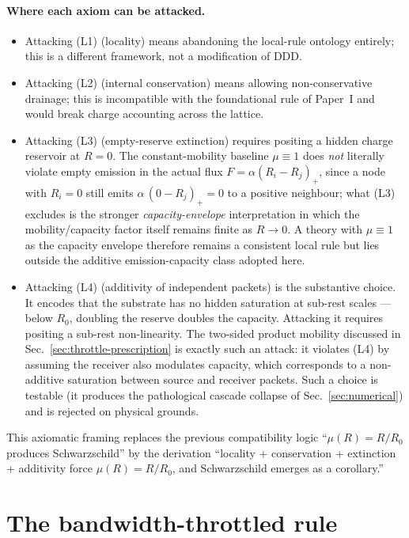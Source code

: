 \documentclass[11pt,a4paper]{article}
\begin{document}
\paragraph{Where each axiom can be attacked.}
\begin{itemize}
\item Attacking (L1) (locality) means abandoning the local-rule
ontology entirely; this is a different framework, not a
modification of DDD.
\item Attacking (L2) (internal conservation) means allowing
non-conservative drainage; this is incompatible with the
foundational rule of Paper~I and would break charge accounting
across the lattice.
\item Attacking (L3) (empty-reserve extinction) requires
positing a hidden charge reservoir at $R=0$. The constant-mobility
baseline $\mu\equiv 1$ does \emph{not} literally violate empty
emission in the actual flux $F=\alpha(R_i-R_j)_+$, since a node
with $R_i=0$ still emits $\alpha\,(0-R_j)_+ = 0$ to a positive
neighbour; what (L3) excludes is the stronger
\emph{capacity-envelope} interpretation in which the
mobility/capacity factor itself remains finite as $R\to 0$.
A theory with $\mu\equiv 1$ as the capacity envelope therefore
remains a consistent local rule but lies outside the additive
emission-capacity class adopted here.
\item Attacking (L4) (additivity of independent packets) is the
substantive choice. It encodes that the substrate has no hidden
saturation at sub-rest scales --- below $R_0$, doubling the
reserve doubles the capacity. Attacking it requires positing a
sub-rest non-linearity. The two-sided product mobility
discussed in Sec.~\ref{sec:throttle-prescription} is exactly
such an attack: it violates (L4) by assuming the receiver also
modulates capacity, which corresponds to a non-additive
saturation between source and receiver packets. Such a choice is
testable (it produces the pathological cascade collapse of
Sec.~\ref{sec:numerical}) and is rejected on physical grounds.
\end{itemize}

This axiomatic framing replaces the previous compatibility logic
``$\mu(R) = R/R_0$ produces Schwarzschild'' by the derivation
``locality + conservation + extinction + additivity force
$\mu(R) = R/R_0$, and Schwarzschild emerges as a corollary.''

\section{The bandwidth-throttled rule}
\label{sec:throttle}
\end{document}
